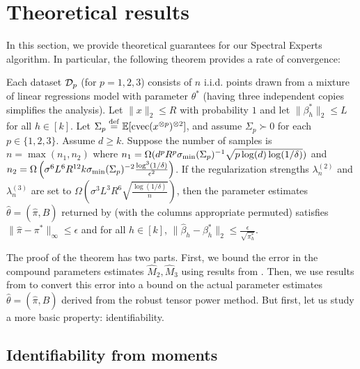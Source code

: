 \section{Theoretical results}

In this section, we provide theoretical guarantees for our Spectral Experts algorithm.
In particular, the following theorem provides a rate of convergence:

\begin{theorem}
\label{thm:convergence}
Each dataset $\mathcal{D}_p$ (for $p = 1, 2, 3$) consists of $n$ i.i.d. points drawn from a mixture
of linear regressions model with parameter $\theta^*$
(having three independent copies simplifies the analysis).
Let $\|x\|_2 \le R$ with probability $1$
and let $\|\beta_h^*\|_2 \le L$ for all $h \in [k]$.
Let $\Sigma_p \stackrel{\rm def}{=} \operatorname{\mathbb{E}}[\operatorname{cvec}(x^{\otimes p})^{\otimes 2}]$, 
and assume $\Sigma_p \succ 0$ for each $p \in \{1,2,3\}$.
Assume $d \ge k$.
Suppose the number of samples is
$n = \max(n_1,n_2)$
where $n_1 = \Omega(d^p R^p \sigma_\text{\rm min}(\Sigma_p)^{-1} \sqrt{p \log(d) \log(1/\delta)})$ and
$n_2 = \Omega\left( \sigma^6 L^6 R^{12} k \sigma_\text{\rm min}(\Sigma_p)^{-2} \frac{\log^3 (1/\delta)}{\epsilon^2} \right)$.
If the regularization strengths $\lambda_n^{(2)}$ and $\lambda_n^{(3)}$ are
set to $\Omega(\sigma^3 L^3 R^6 \sqrt{\frac{\log(1/\delta)}{n}})$,
then the parameter estimates $\hat\theta = (\hat\pi, \hat B)$ returned by
 (with the columns appropriate permuted)
satisfies 
$\|\hat\pi - \pi^*\|_{\infty} \le \epsilon$
and for all $h \in [k]$,
$\|\hat\beta_h - \beta^*_h\|_2 \le \frac{\epsilon}{\sqrt{\pi_h^*}}$.
\end{theorem}

The proof of the theorem has two parts.
First, we bound the error in the compound parameters estimates $\hat M_2,\hat M_3$
using results from \citet{Tomioka2011}.
Then, we use results from \cite{AnandkumarGeHsu2012} to convert this error
into a bound on the actual parameter estimates $\hat\theta = (\hat\pi, \hat B)$
derived from the robust tensor power method.
But first, let us study a more basic property: identifiability.


\subsection{Identifiability from moments}

